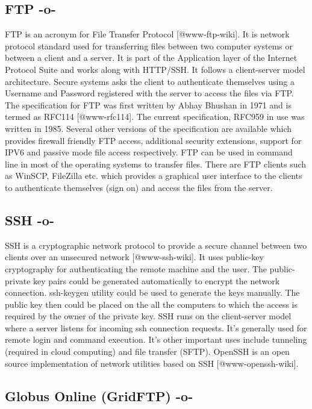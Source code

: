 \subsection{FTP -o-}

FTP is an acronym for File Transfer Protocol [@www-ftp-wiki]. It
is network protocol standard used for transferring files between two
computer systems or between a client and a server. It is part of the
Application layer of the Internet Protocol Suite and works along with
HTTP/SSH. It follows a client-server model architecture. Secure
systems asks the client to authenticate themselves using a Username
and Password registered with the server to access the files via
FTP. The specification for FTP was first written by Abhay Bhushan in
1971 and is termed as RFC114 [@www-rfc114]. The current
specification, RFC959 in use was written in 1985. Several other
versions of the specification are available which provides firewall
friendly FTP access, additional security extensions, support for IPV6
and passive mode file access respectively. FTP can be used in command
line in most of the operating systems to transfer files. There are FTP
clients such as WinSCP, FileZilla etc. which provides a graphical user
interface to the clients to authenticate themselves (sign on) and
access the files from the server.


     
\subsection{SSH -o-}

SSH is a cryptographic network protocol to provide a secure channel
between two clients over an unsecured network [@www-ssh-wiki]. It
uses public-key cryptography for authenticating the remote machine and
the user. The public-private key pairs could be generated
automatically to encrypt the network connection.  ssh-keygen utility
could be used to generate the keys manually.  The public key then
could be placed on the all the computers to which the access is
required by the owner of the private key.  SSH runs on the
client-server model where a server listens for incoming ssh connection
requests. It's generally used for remote login and command
execution. It's other important uses include tunneling (required in
cloud computing) and file transfer (SFTP).  OpenSSH is an open source
implementation of network utilities based on
SSH [@www-openssh-wiki].



\subsection{Globus Online (GridFTP) -o-}

